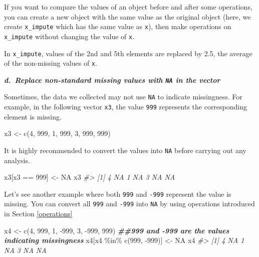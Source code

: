 \documentclass[
]{book}
\newenvironment{Shaded}{\begin{snugshade}}{\end{snugshade}}
\newcommand{\CommentTok}[1]{\textcolor[rgb]{0.56,0.35,0.01}{\textit{#1}}}
\newcommand{\ConstantTok}[1]{\textcolor[rgb]{0.00,0.00,0.00}{#1}}
\newcommand{\DecValTok}[1]{\textcolor[rgb]{0.00,0.00,0.81}{#1}}
\newcommand{\DocumentationTok}[1]{\textcolor[rgb]{0.56,0.35,0.01}{\textbf{\textit{#1}}}}
\newcommand{\FunctionTok}[1]{\textcolor[rgb]{0.00,0.00,0.00}{#1}}
\newcommand{\NormalTok}[1]{#1}
\newcommand{\OtherTok}[1]{\textcolor[rgb]{0.56,0.35,0.01}{#1}}
\newcommand{\SpecialCharTok}[1]{\textcolor[rgb]{0.00,0.00,0.00}{#1}}
\newenvironment{blackbox}{
  \definecolor{shadecolor}{rgb}{0, 0, 0}  %
  \color{white}
  \begin{shaded}}
 {\end{shaded}}
\newenvironment{infobox}[1]
  {
  \begin{itemize}
  \renewcommand{\labelitemi}{
    \raisebox{-.7\height}[0pt][0pt]{
      {\setkeys{Gin}{width=3em,keepaspectratio}
        \texttt{[image: pics/\#1]}}
    }
  }
  \setlength{\fboxsep}{1em}
  \begin{blackbox}
  \item
  }
  {
  \end{blackbox}
  \end{itemize}
  }
\begin{document}
\begin{infobox}{caution}
If you want to compare the values of an object before and after some operations, you can create a new object with the same value as the original object (here, we create \texttt{x\_impute} which has the same value as \texttt{x}), then make operations on \texttt{x\_impute} without changing the value of \texttt{x}.

\end{infobox}

In \texttt{x\_impute}, values of the 2nd and 5th elements are replaced by 2.5, the average of the non-missing values of \texttt{x}.

\textbf{\emph{d.~Replace non-standard missing values with \texttt{NA} in the vector}}

Sometimes, the data we collected may not use \texttt{NA} to indicate missingness. For example, in the following vector \texttt{x3}, the value \texttt{999} represents the corresponding element is missing.

\begin{Shaded}
\begin{Highlighting}[]
\NormalTok{x3 }\OtherTok{\textless{}{-}} \FunctionTok{c}\NormalTok{(}\DecValTok{4}\NormalTok{, }\DecValTok{999}\NormalTok{, }\DecValTok{1}\NormalTok{, }\DecValTok{999}\NormalTok{, }\DecValTok{3}\NormalTok{, }\DecValTok{999}\NormalTok{, }\DecValTok{999}\NormalTok{)}
\end{Highlighting}
\end{Shaded}

It is highly recommended to convert the values into \texttt{NA} before carrying out any analysis.

\begin{Shaded}
\begin{Highlighting}[]
\NormalTok{x3[x3 }\SpecialCharTok{==} \DecValTok{999}\NormalTok{] }\OtherTok{\textless{}{-}} \ConstantTok{NA}
\NormalTok{x3}
\CommentTok{\#\textgreater{} [1]  4 NA  1 NA  3 NA NA}
\end{Highlighting}
\end{Shaded}

Let's see another example where both \texttt{999} and \texttt{-999} represent the value is missing. You can convert all \texttt{999} and \texttt{-999} into \texttt{NA} by using operations introduced in Section \ref{operations}

\begin{Shaded}
\begin{Highlighting}[]
\NormalTok{x4 }\OtherTok{\textless{}{-}} \FunctionTok{c}\NormalTok{(}\DecValTok{4}\NormalTok{, }\DecValTok{999}\NormalTok{, }\DecValTok{1}\NormalTok{, }\SpecialCharTok{{-}}\DecValTok{999}\NormalTok{, }\DecValTok{3}\NormalTok{, }\SpecialCharTok{{-}}\DecValTok{999}\NormalTok{, }\DecValTok{999}\NormalTok{)}
\DocumentationTok{\#\#999 and {-}999 are the values indicating missingness}
\NormalTok{x4[x4 }\SpecialCharTok{\%in\%} \FunctionTok{c}\NormalTok{(}\DecValTok{999}\NormalTok{, }\SpecialCharTok{{-}}\DecValTok{999}\NormalTok{)] }\OtherTok{\textless{}{-}} \ConstantTok{NA}
\NormalTok{x4}
\CommentTok{\#\textgreater{} [1]  4 NA  1 NA  3 NA NA}
\end{Highlighting}
\end{Shaded}
\end{document}
